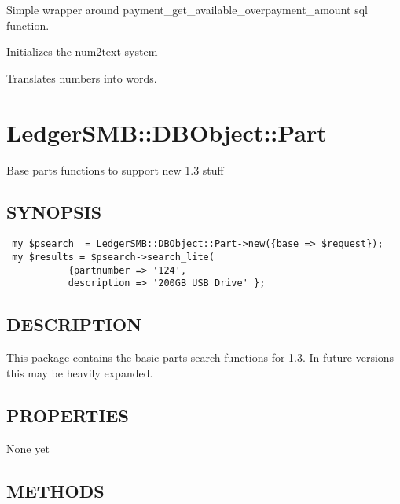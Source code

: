 \begin{description}
\begin{description}
\begin{description}
\begin{description}
\begin{description}
\begin{description}
\begin{description}
\begin{description}
\begin{description}
\begin{description}
Simple wrapper around payment\_get\_available\_overpayment\_amount sql function.


\item[{init}] \mbox{}

Initializes the num2text system


\item[{num2text}] \mbox{}

Translates numbers into words.

\section{LedgerSMB::DBObject::Part\label{LedgerSMB::DBObject::Part}}


Base parts functions to support new 1.3 stuff

\subsection*{SYNOPSIS\label{LedgerSMB::DBObject::Part_SYNOPSIS}}
\begin{verbatim}
 my $psearch  = LedgerSMB::DBObject::Part->new({base => $request});
 my $results = $psearch->search_lite(
           {partnumber => '124', 
           description => '200GB USB Drive' };
\end{verbatim}
\subsection*{DESCRIPTION\label{LedgerSMB::DBObject::Part_DESCRIPTION}}


This package contains the basic parts search functions for 1.3.  In future
versions this may be heavily expanded.

\subsection*{PROPERTIES\label{LedgerSMB::DBObject::Part_PROPERTIES}}


None yet

\subsection*{METHODS\label{LedgerSMB::DBObject::Part_METHODS}}
\begin{description}


\end{description}
\end{description}
\end{description}
\end{description}
\end{description}
\end{description}
\end{description}
\end{description}
\end{description}
\end{description}
\end{description}
